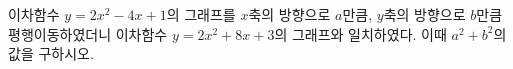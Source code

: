 \hspace*{2mm}\begin{minipage}[t]{\dimexpr\linewidth-2mm\relax}\vspace{0pt}
이차함수 $y=2x^2-4x+1$의 그래프를 $x$축의 방향으로 $a$만큼, $y$축의 방향으로 $b$만큼 평행이동하였더니 이차함수 $y=2x^2+8x+3$의 그래프와 일치하였다. 이때 $a^2+b^2$의 값을 구하시오.\end{minipage}
